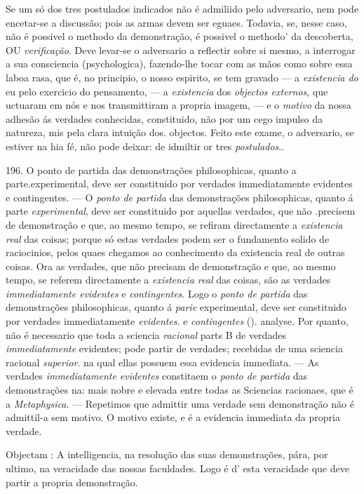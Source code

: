 Se um só dos tres postulados indicados não é admiliido pelo adversario, nem pode encetar-se a discussão; pois as armas devem ser eguaes. Todavia, se, nesse caso, não é possivel o methodo da demonstração, é possivel o methodo' da descoberta, OU \emph{verificação}. Deve levar-se o adversario a reflectir sobre si mesmo, a interrogar a sua consciencia (psychologica), fazendo-lhe tocar com as mãos como sobre essa laboa rasa, que é, no principio, o nosso espirito, se tem gravado --- a \emph{existencia do} eu pelo exercicio do pensamento, --- a \emph{existencia} dos \emph{objectos externos}, que uctuaram em nós e nos transmittiram a propria imagem, --- e o \emph{motivo} da nossa adhesão ás verdades conhecidas, constituido, não por um cego impulso da natureza, mis pela clara intuição dos. objectos. Feito este exame, o adversario, se estiver na hia fé, não pode deixar: de idmiltir or tres \emph{postulados}..

196. O ponto de partida das demonstrações philosophicas, quanto a parte.experimental, deve ser constituido por verdades immediatamente evidentes e contingentes. --- O \emph{ponto de partida} das demonstrações philosophicas, quanto á parte \emph{experimental}, deve ser constituido por aquellas verdades, que não .precisem de demonstração e que, ao mesmo tempo, se refiram directamente a \emph{existencia real} das coisas; porque só estas verdades podem ser o fundamento solido de raciocinios, pelos quaes chegamos ao conhecimento da existencia real de outras coisas. Ora as verdades, que não precisam de demonstração e que, ao mesmo tempo, se referem directamente a \emph{existencia real} das coisas, são as verdades \emph{immediatamente evidentes} e \emph{contingentes}. Logo o \emph{ponto de partida} das demonstrações philosophicas, quanto á \emph{parie} experimental, deve ser constituido por verdades immediatamente \emph{evidentes}. e \emph{contingentes} (). \textbar{} analyse. Por quanto, não é necessario que toda a sciencia \emph{racional} parts B de verdades \emph{immediatamente} evidentes; pode partir de verdades; recebidas de uma sciencia racional \emph{superior}. na qual ellas possuem essa evidencia immediata. --- As verdades \emph{immediatamente evidentes} constitaem o \emph{ponto de partida} das demonstrações na: mais nobre e elevada entre todas as Sciencias racionaes, que é a \emph{Metaphysica}. --- Repetimos que admittir uma verdade sem demonstração não é admittil-a sem motivo. O motivo existe, e é a evidencia immediata da propria verdade.

Objectam : A intelligencia, na resolução das suas demonstrações, pára, por ultimo, na veracidade das nossas faculdades. Logo é d' esta veracidade que deve partir a propria demonstração.


